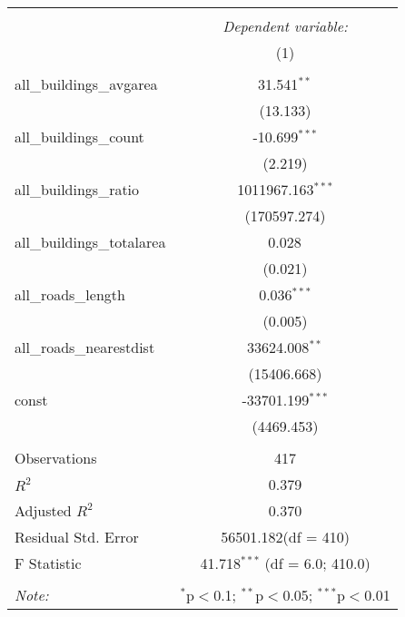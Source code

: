 \begin{table}[!htbp] \centering
\begin{tabular}{@{\extracolsep{5pt}}lc}
\\[-1.8ex]\hline
\hline \\[-1.8ex]
& \multicolumn{1}{c}{\textit{Dependent variable:}} \
\cr \cline{1-2}
\\[-1.8ex] & (1) \\
\hline \\[-1.8ex]
 all_buildings_avgarea & 31.541$^{**}$ \\
  & (13.133) \\
 all_buildings_count & -10.699$^{***}$ \\
  & (2.219) \\
 all_buildings_ratio & 1011967.163$^{***}$ \\
  & (170597.274) \\
 all_buildings_totalarea & 0.028$^{}$ \\
  & (0.021) \\
 all_roads_length & 0.036$^{***}$ \\
  & (0.005) \\
 all_roads_nearestdist & 33624.008$^{**}$ \\
  & (15406.668) \\
 const & -33701.199$^{***}$ \\
  & (4469.453) \\
\hline \\[-1.8ex]
 Observations & 417 \\
 $R^2$ & 0.379 \\
 Adjusted $R^2$ & 0.370 \\
 Residual Std. Error & 56501.182(df = 410)  \\
 F Statistic & 41.718$^{***}$ (df = 6.0; 410.0) \\
\hline
\hline \\[-1.8ex]
\textit{Note:} & \multicolumn{1}{r}{$^{*}$p$<$0.1; $^{**}$p$<$0.05; $^{***}$p$<$0.01} \\
\end{tabular}
\end{table}